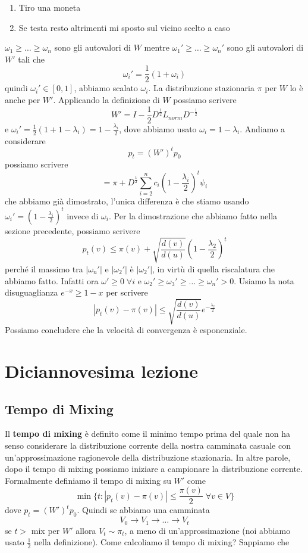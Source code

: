 \documentclass[12pt]{report}
\begin{document}
\begin{enumerate}
    \item Tiro una moneta
    \item Se testa resto altrimenti mi sposto sul vicino scelto a caso
\end{enumerate}
$\omega_1\geq \dots\geq \omega_n$ sono gli autovalori di $W$ mentre $\omega_1'\geq \dots\geq \omega_n'$  sono gli autovalori di $W'$ tali che 
$$\omega_i' = \frac{1}{2}(1 + \omega_i)$$
quindi $\omega_i' \in [0,1]$, abbiamo scalato $\omega_i$. La distribuzione stazionaria $\pi$ per $W$ lo è anche per $W'$. Applicando la definizione di $W$ possiamo scrivere
$$W' = I - \frac{1}{2}D^\frac{1}{2} L_{norm} D^{-\frac{1}{2}}$$
e $\omega_i' = \frac{1}{2}(1 + 1 -\lambda_i) = 1 - \frac{\lambda_i}{2}$, dove abbiamo usato $\omega_i = 1 - \lambda_i$.
Andiamo a considerare
$$p_t = (W')^t p_0$$
possiamo scrivere
$$= \pi + D^\frac{1}{2} \sum_{i=2}^n c_i (1 -\frac{\lambda_i}{2})^t \psi_i$$
che abbiamo già dimostrato, l'unica differenza è che stiamo usando $\omega_i' = (1 -\frac{\lambda_i}{2})^t$ invece di $\omega_i$. Per la dimostrazione che abbiamo fatto nella sezione precedente, possiamo scrivere 
$$p_t(v) \leq \pi(v) + \sqrt{\frac{d(v)}{d(u)}}(1 - \frac{\lambda_2}{2})^t$$
perché il massimo tra $|\omega_n'|$ e $|\omega_2'|$ è  $|\omega_2'|$, in virtù di quella riscalatura che abbiamo fatto. Infatti ora $\omega' \geq 0 \; \forall i$ e $\omega_2' \geq \omega_3' \geq \dots \geq \omega_n' > 0$. Usiamo la nota disuguaglianza $e^{-x} \geq 1-x$ per scrivere
$$|p_t(v) - \pi(v) | \leq \sqrt{\frac{d(v)}{d(u)}} e^{-\frac{\lambda_2}{2}}$$
Possiamo concludere che la velocità di convergenza è esponenziale.


\chapter{Diciannovesima lezione}

\section{Tempo di Mixing}
Il \textbf{tempo di mixing} è definito come il minimo tempo prima del quale non ha senso considerare la distribuzione corrente della nostra camminata casuale con un'approssimazione ragionevole della distribuzione stazionaria. In altre parole, dopo il tempo di mixing possiamo iniziare a campionare la distribuzione corrente. Formalmente definiamo il tempo di mixing su $W'$ come
$$\min\{t  :  |p_t(v) -\pi(v)| \leq \frac{\pi(v)}{2}\; \forall v \in V\}$$
dove $p_t = (W')^t p_0$. Quindi se abbiamo una camminata
$$V_0 \rightarrow V_1 \rightarrow \dots \rightarrow V_t$$
se $t >$ mix per $W'$ allora $V_t \sim \pi_t$, a meno di un'approssimazione (noi abbiamo usato $\frac{1}{2}$ nella definizione). Come calcoliamo il tempo di mixing?
Sappiamo che 
\end{document}
